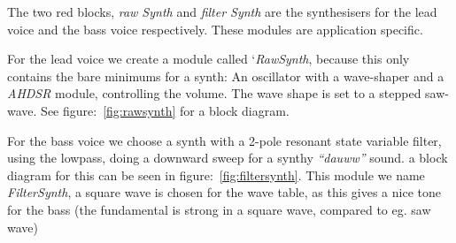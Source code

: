 
The two red blocks, \emph{raw Synth} and \emph{filter Synth} are the
synthesisers for the lead voice and the bass voice respectively. These modules
are application specific.

For the lead voice we create a module called `\emph{RawSynth}, because this only
contains the bare minimums for a synth: An oscillator with a wave-shaper and a
\emph{AHDSR} module, controlling the volume. The wave shape is set to a stepped
saw-wave. See figure:~\ref{fig:rawsynth} for a block diagram.


For the bass voice we choose a synth with a 2-pole resonant state variable
filter, using the lowpass, doing a downward sweep for a synthy \emph{``dauww''}
sound. a block diagram for this can be seen in figure:~\ref{fig:filtersynth}.
This module we name \emph{FilterSynth}, a square wave is chosen for the
wave table, as this gives a nice tone for the bass (the fundamental is strong
in a square wave, compared to eg. saw wave)





